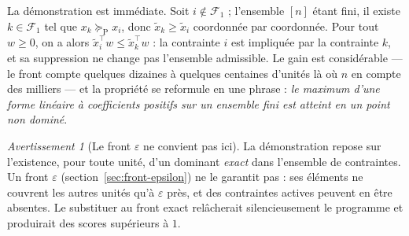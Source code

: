 \documentclass[11pt,a4paper]{article}
\theoremstyle{definition}
\theoremstyle{remark}
\newtheorem{avertissement}{Avertissement}[section]
\newcommand{\paretoeq}{\succeq_{\mathrm{P}}}
\begin{document}
\bigskip

La démonstration est immédiate. Soit $i \notin \mathcal{F}_1$ ; l'ensemble $[n]$ étant
fini, il existe $k \in \mathcal{F}_1$ tel que $x_k \paretoeq x_i$, donc
$\tilde{x}_k \ge \tilde{x}_i$ coordonnée par coordonnée. Pour tout $w \ge 0$, on a alors
$\tilde{x}_i^\top w \le \tilde{x}_k^\top w$ : la contrainte $i$ est impliquée par la
contrainte $k$, et sa suppression ne change pas l'ensemble admissible. Le gain est
considérable --- le front compte quelques dizaines à quelques centaines d'unités là où
$n$ en compte des milliers --- et la propriété se reformule en une phrase : \emph{le
maximum d'une forme linéaire à coefficients positifs sur un ensemble fini est atteint en
un point non dominé}.

\medskip

\begin{avertissement}[Le front $\varepsilon$ ne convient pas ici]
  \label{av:bod-front-eps}
  La démonstration repose sur l'existence, pour toute unité, d'un dominant \emph{exact}
  dans l'ensemble de contraintes. Un front $\varepsilon$
  (section~\ref{sec:front-epsilon}) ne le garantit pas : ses éléments ne couvrent les
  autres unités qu'à $\varepsilon$ près, et des contraintes actives peuvent en être
  absentes. Le substituer au front exact relâcherait silencieusement le programme et
  produirait des scores supérieurs à $1$.
\end{avertissement}

\bigskip
\end{document}
